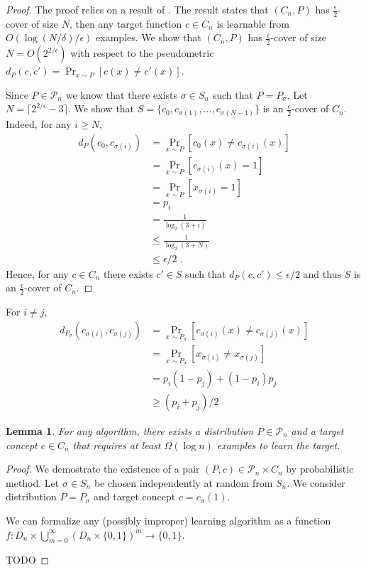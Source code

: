 \documentclass[12pt]{article}
\newtheorem{lemma}{Lemma}
\renewcommand{\P}{\mathcal{P}}
\begin{document}
\begin{proof}
The proof relies on a result of \cite{Benedek-Itai-1991}. The result states that
$(C_n,P)$ has $\tfrac{\epsilon}{2}$-cover of size $N$, then any target function
$c \in C_n$ is learnable from $O(\log(N/\delta)/\epsilon)$ examples. We show
that $(C_n,P)$ has $\tfrac{\epsilon}{2}$-cover of size $N = O(2^{2/\epsilon})$
with respect to the pseudometric $d_P(c,c') = \Pr_{x \sim P}[c(x) \neq c'(x)]$.

Since $P \in \P_n$ we know that there exists $\sigma \in S_n$
such that $P = P_\sigma$. Let $N = \lceil 2^{2/\epsilon} - 3 \rceil$.
We show that $S = \{c_0, c_{\sigma(1)}, \dots, c_{\sigma(N-1)}\}$ is
an $\tfrac{\epsilon}{2}$-cover of $C_n$. Indeed, for any $i \ge N$,
\begin{align*}
d_P(c_0, c_{\sigma(i)})
& = \Pr_{x \sim P}[c_0(x) \neq c_{\sigma(i)}(x)] \\
& = \Pr_{x \sim P}[c_{\sigma(i)}(x) = 1] \\
& = \Pr_{x \sim P}[x_{\sigma(i)} = 1] \\
& = p_i \\
& = \frac{1}{\log_2(3+i)} \\
& \le \frac{1}{\log_2(3+N)} \\
& \le \epsilon/2 \; .
\end{align*}
Hence, for any $c \in C_n$ there exists $c' \in S$ such that $d_P(c,c') \le \epsilon/2$
and thus $S$ is an $\tfrac{\epsilon}{2}$-cover of $C_n$.
\end{proof}

For $i \neq j$,
\begin{align*}
d_{P_\sigma}(c_{\sigma(i)}, c_{\sigma(j)})
& = \Pr_{x \sim P_{\sigma}}[c_{\sigma(i)}(x) \neq c_{\sigma(j)}(x)] \\
& = \Pr_{x \sim P_{\sigma}}[x_{\sigma(i)} \neq x_{\sigma(j)}] \\
& = p_i (1 - p_j) + (1 - p_i) p_j \\
& \ge (p_i + p_j) / 2
\end{align*}

\begin{lemma}
For any algorithm, there exists a distribution $P \in \P_n$
and a target concept $c \in C_n$ that requires at least $\Omega(\log n)$
examples to learn the target.
\end{lemma}

\begin{proof}
We demostrate the existence of a pair $(P,c) \in \P_n \times C_n$ by
probabilistic method. Let $\sigma \in S_n$ be chosen independently at random
from $S_n$. We consider distribution $P = P_\sigma$ and target concept $c =
c_\sigma(1)$.

We can formalize any (possibly improper) learning algorithm as a function $f:D_n
\times \bigcup_{m=0}^\infty (D_n \times \{0,1\})^m \to \{0,1\}$.

TODO
\end{proof}
\end{document}
